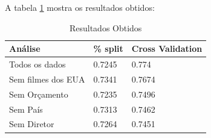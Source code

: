 A tabela \ref{results} mostra os resultados obtidos:

\begin{longtable}{|l|l|l|}
\caption{Resultados Obtidos}
\label{results}
\\\hline
\textbf{Análise} & \textbf{\% split} & \textbf{Cross Validation} \\ \hline
Todos os dados      & 0.7245    & 0.774               \\ \hline
Sem filmes dos EUA      & 0.7341    & 0.7674               \\ \hline
Sem Orçamento         & 0.7235     & 0.7496              \\ \hline
Sem País         & 0.7313     & 0.7462              \\ \hline
Sem Diretor         & 0.7264     & 0.7451              \\ \hline
\end{longtable}
